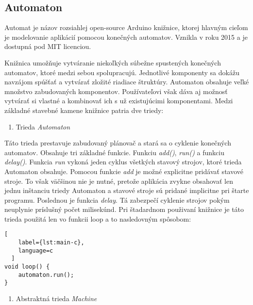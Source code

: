 \subsection{Automaton}
\noindent \par Automat \cite{tinkerspyAutomaton2021} je názov rozsiahlej open-source Arduino knižnice, ktorej hlavným cieľom
je modelovanie aplikácií pomocou konečných automatov. Vznikla v roku 2015 a je dostupná pod MIT licenciou.
\par Knižnica umožňuje vytváranie niekoľkých súbežne spustených konečných automatov, ktoré medzi sebou spolupracujú.
Jednotlivé komponenty sa dokážu navzájom spúšťať a vytvárať zložité riadiace štruktúry.
Automaton obsahuje veľké množstvo zabudovaných komponentov. Používateľovi však dáva aj možnosť vytvárať si vlastné a kombinovať ich s už existujúcimi komponentami.
Medzi základné stavebné kamene knižnice patria dve triedy:
\begin{enumerate}
  \item Trieda \textit{Automaton}
\end{enumerate}

\noindent \par Táto trieda prestavuje zabudovaný plánovač a stará sa o cyklenie konečných automatov. Obsahuje tri základné funkcie. Funkciu \textit{add()}, \textit{run()} a funkciu \textit{delay()}.
Funkcia \textit{run} vykoná jeden cyklus všetkých stavový strojov, ktoré trieda Automaton obsahuje.
Pomocou funkcie \textit{add} je možné explicitne pridávať stavové stroje.
To však väčšinou nie je nutné, pretože aplikácia zvykne obsahovať len jednu inštanciu triedy Automaton a stavové stroje sú pridané implicitne pri štarte programu.
Poslednou je funkcia \textit{delay}. Tá zabezpečí cyklenie strojov pokým neuplynie príslušný počet milisekúnd.
Pri štadardnom použivaní knižnice je táto trieda použitá len vo funkcii loop a to nasledovným spôsobom:

\begin{lstlisting}[
    label={lst:main-c},
    language=c
  ]
void loop() {
    automaton.run();
}

\end{lstlisting}

\begin{enumerate}[resume]
  \item Abstraktná trieda \textit{Machine}
\end{enumerate}

